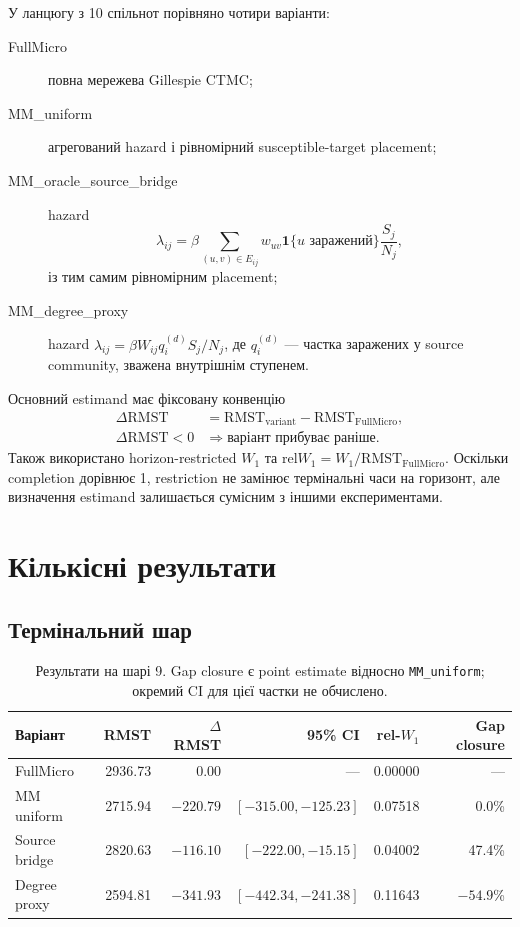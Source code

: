 \documentclass[11pt,a4paper]{article}
\begin{document}
У ланцюгу з 10 спільнот порівняно чотири варіанти:
\begin{description}
  \item[FullMicro] повна мережева Gillespie CTMC;
  \item[MM\_uniform] агрегований hazard і рівномірний susceptible-target placement;
  \item[MM\_oracle\_source\_bridge] hazard
  \[
   \lambda_{ij}=\beta\!\sum_{(u,v)\in E_{ij}}
   w_{uv}\mathbf{1}\{u\text{ заражений}\}\frac{S_j}{N_j},
  \]
  із тим самим рівномірним placement;
  \item[MM\_degree\_proxy] hazard
  $\lambda_{ij}=\beta W_{ij}q_i^{(d)}S_j/N_j$, де $q_i^{(d)}$ --- частка
  заражених у source community, зважена внутрішнім ступенем.
\end{description}

Основний estimand має фіксовану конвенцію
\[
 \begin{aligned}
 \Delta\mathrm{RMST}
   &=\mathrm{RMST}_{\mathrm{variant}}-\mathrm{RMST}_{\mathrm{FullMicro}},\\
 \Delta\mathrm{RMST}<0
   &\Longrightarrow \text{варіант прибуває раніше}.
 \end{aligned}
\]
Також використано horizon-restricted $W_1$ та
$\mathrm{rel}W_1=W_1/\mathrm{RMST}_{\mathrm{FullMicro}}$. Оскільки
completion дорівнює 1, restriction не замінює термінальні часи на горизонт,
але визначення estimand залишається сумісним з іншими експериментами.

\section{Кількісні результати}\label{sec:results}

\subsection{Термінальний шар}

\begin{table}[H]
\centering
\small
\caption{Результати на шарі 9. Gap closure є point estimate відносно
\texttt{MM\_uniform}; окремий CI для цієї частки не обчислено.}
\label{tab:terminal}
\begin{tabular}{lrrrrr}
\toprule
Варіант & RMST & $\Delta$RMST & 95\% CI & rel-$W_1$ & Gap closure \\
\midrule
FullMicro & 2936.73 & 0.00 & --- & 0.00000 & --- \\
MM uniform & 2715.94 & $-220.79$ & $[-315.00,-125.23]$ & 0.07518 & 0.0\% \\
Source bridge & 2820.63 & $-116.10$ & $[-222.00,-15.15]$ & 0.04002 & 47.4\% \\
Degree proxy & 2594.81 & $-341.93$ & $[-442.34,-241.38]$ & 0.11643 & $-54.9$\% \\
\bottomrule
\end{tabular}
\end{table}
\end{document}
